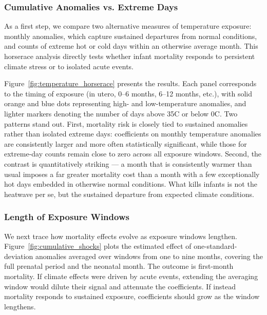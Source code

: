 \documentclass[a4paper]{article}
\begin{document}
\subsubsection{Cumulative Anomalies vs. Extreme Days}

As a first step, we compare two alternative measures of temperature exposure: monthly anomalies, which capture sustained departures from normal conditions, and counts of extreme hot or cold days within an otherwise average month. This horserace analysis directly tests whether infant mortality responds to persistent climate stress or to isolated acute events.

Figure~\ref{fig:temperature_horserace} presents the results. Each panel corresponds to the timing of exposure (in utero, 0--6 months, 6--12 months, etc.), with solid orange and blue dots representing high- and low-temperature anomalies, and lighter markers denoting the number of days above 35\textdegree C or below 0\textdegree C. Two patterns stand out. First, mortality risk is closely tied to sustained anomalies rather than isolated extreme days: coefficients on monthly temperature anomalies are consistently larger and more often statistically significant, while those for extreme-day counts remain close to zero across all exposure windows. Second, the contrast is quantitatively striking — a month that is consistently warmer than usual imposes a far greater mortality cost than a month with a few exceptionally hot days embedded in otherwise normal conditions. What kills infants is not the heatwave per se, but the sustained departure from expected climate conditions.

\subsubsection{Length of Exposure Windows}

We next trace how mortality effects evolve as exposure windows lengthen. Figure~\ref{fig:cumulative_shocks} plots the estimated effect of one-standard-deviation anomalies averaged over windows from one to nine months, covering the full prenatal period and the neonatal month. The outcome is first-month mortality. If climate effects were driven by acute events, extending the averaging window would dilute their signal and attenuate the coefficients. If instead mortality responds to sustained exposure, coefficients should grow as the window lengthens.
\end{document}
